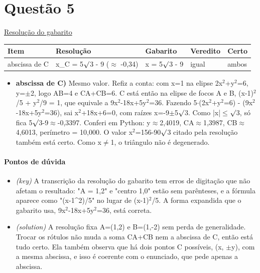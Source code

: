 \documentclass{article}%
\begin{document}
\section*{Questão 5}%
\href{https://poliedroresolve.sistemapoliedro.com.br/vestibulares/ita/2027/ita-2-fase-dia-1-20-10-2026-2-fase-dia-1/dissertativa-5-matematica-2-fase-dia-1-ita-2027}{Resolução do gabarito}\par\smallskip%
\begin{longtable}{@{}p{} p{} p{} p{} p{}@{}}\toprule Item & Resolução & Gabarito & Veredito & Certo \\ \midrule
abscissa de C & x\_C = 5$\surd$3 - 9 ($\approx$ -0,34) & x = 5$\surd$3 - 9 & igual & ambos \\
\bottomrule\end{longtable}%
\begin{itemize}%
\item%
\textbf{abscissa de C)} Mesmo valor. Refiz a conta: com x=1 na elipse 2x$^2$+y$^2$=6, y=$\pm$2, logo AB=4 e CA+CB=6. C está então na elipse de focos A e B, (x-1)$^2$/5 + y$^2$/9 = 1, que equivale a 9x$^2$-18x+5y$^2$=36. Fazendo 5$\cdot$(2x$^2$+y$^2$=6) - (9x$^2$-18x+5y$^2$=36), sai x$^2$+18x+6=0, com raízes x=-9$\pm$5$\surd$3. Como |x|$\leq$$\surd$3, só fica 5$\surd$3-9$\approx$-0,3397. Conferi em Python: y$\approx$2,4019, CA$\approx$1,3987, CB$\approx$4,6013, perímetro = 10,000. O valor x$^2$=156-90$\surd$3 citado pela resolução também está certo. Como x$\neq$1, o triângulo não é degenerado.%
\end{itemize}%
\paragraph{Pontos de dúvida}%
\begin{itemize}%
\item%
\textit{(key)} A transcrição da resolução do gabarito tem erros de digitação que não afetam o resultado: "A = 1,2" e "centro 1,0" estão sem parênteses, e a fórmula aparece como "(x{-}1\^{}2)/5" no lugar de (x-1)$^2$/5. A forma expandida que o gabarito usa, 9x$^2$-18x+5y$^2$=36, está correta.%
\item%
\textit{(solution)} A resolução fixa A=(1,2) e B=(1,-2) sem perda de generalidade. Trocar os rótulos não muda a soma CA+CB nem a abscissa de C, então está tudo certo. Ela também observa que há dois pontos C possíveis, (x, $\pm$y), com a mesma abscissa, e isso é coerente com o enunciado, que pede apenas a abscissa.%
\end{itemize}%
\end{document}
